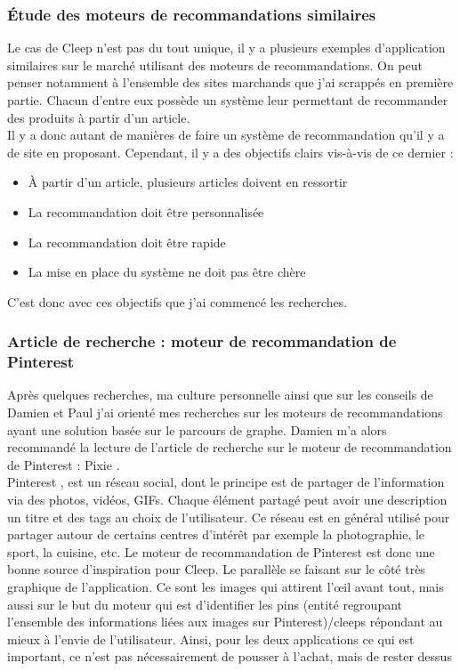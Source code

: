 \documentclass{article} %
\begin{document}
\subsubsection{Étude des moteurs de recommandations similaires}

Le cas de Cleep n'est pas du tout unique, il y a plusieurs exemples d'application similaires sur le marché utilisant des moteurs de recommandations. On peut penser notamment à l'ensemble des sites marchands que j'ai scrappés en première partie. Chacun d'entre eux possède un système leur permettant de recommander des produits à partir d'un article.\\
Il y a donc autant de manières de faire un système de recommandation qu'il y a de site en proposant. Cependant, il y a des objectifs clairs vis-à-vis de ce dernier :
\begin{itemize}
 \itemsep 0em
 \item À partir d'un article, plusieurs articles doivent en ressortir
 \item La recommandation doit être personnalisée
 \item La recommandation doit être rapide
 \item La mise en place du système ne doit pas être chère
\end{itemize}
C'est donc avec ces objectifs que j'ai commencé les recherches.

\subsubsection{Article de recherche : moteur de recommandation de Pinterest\\}
Après quelques recherches, ma culture personnelle  ainsi que sur les conseils de Damien et Paul j'ai orienté mes recherches sur les moteurs de recommandations ayant une solution basée sur le parcours de graphe. Damien m'a alors recommandé la lecture de l'article de recherche sur le moteur de recommandation de Pinterest : Pixie \cite{pixie}.\\
Pinterest \cite{Pinterest}, est un réseau social, dont le principe est de partager de l'information via des photos, vidéos, GIFs. Chaque élément partagé peut avoir une description un titre et des tags au choix de l'utilisateur. Ce réseau est en général utilisé pour partager autour de certains centres d'intérêt par exemple la photographie, le sport, la cuisine, etc. Le moteur de recommandation de Pinterest est donc une bonne source d'inspiration pour Cleep. Le parallèle se faisant sur le côté très graphique de l'application. Ce sont les images qui attirent l'œil avant tout, mais aussi sur le but du moteur qui est d'identifier les pins (entité regroupant l'ensemble des informations liées aux images sur Pinterest)/cleeps répondant au mieux à l'envie de l'utilisateur. Ainsi, pour les deux applications ce qui est important, ce n'est pas nécessairement de pousser à l'achat, mais de rester dessus \\
\end{document}
